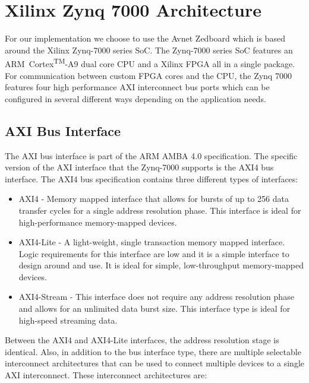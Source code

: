 \documentclass[journal]{IEEEtran}
\begin{document}
\section{Xilinx Zynq 7000 Architecture}
For our implementation we choose to use the Avnet Zedboard which is based around the Xilinx Zynq-7000 series SoC. The Zynq-7000 series SoC features an ARM\textregistered\ Cortex\textsuperscript{TM}-A9 dual core CPU and a Xilinx FPGA all in a single package. For communication between custom FPGA cores and the CPU, the Zynq 7000 features four high performance AXI interconnect bus ports which can be configured in several different ways depending on the application needs.




\subsection{AXI Bus Interface}
The AXI bus interface is part of the ARM AMBA 4.0 specification. The specific version of the AXI interface that the Zynq-7000 supports is the AXI4 bus interface. The AXI4 bus specification contains three different types of interfaces: \\

	\begin{itemize}
		
		\item AXI4 - Memory mapped interface that allows for bursts of up to 256 data transfer cycles for a single address resolution phase. This interface is ideal for high-performance memory-mapped devices.
		
		\item AXI4-Lite - A light-weight, single transaction memory mapped interface. Logic requirements for this interface are low and it is a simple interface to design around and use. It is ideal for simple, low-throughput memory-mapped devices.
		
		\item AXI4-Stream - This interface does not require any address resolution phase and allows for an unlimited data burst size. This interface type is ideal for high-speed streaming data. \\
		
	\end{itemize}

Between the AXI4 and AXI4-Lite interfaces, the address resolution stage is identical. Also, in addition to the bus interface type, there are multiple selectable interconnect architectures that can be used to connect multiple devices to a single AXI interconnect. These interconnect architectures are: \\
\end{document}
